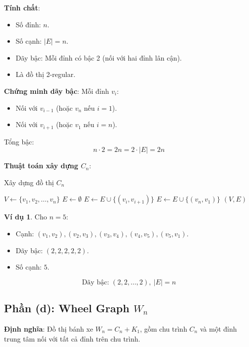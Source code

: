 \documentclass[a4paper,12pt]{article}
\theoremstyle{plain}
\theoremstyle{definition}
\newtheorem{example}{Ví dụ}
\begin{document}
\textbf{Tính chất}:
\begin{itemize}
    \item Số đỉnh: \( n \).
    \item Số cạnh: \( |E| = n \).
    \item Dãy bậc: Mỗi đỉnh có bậc 2 (nối với hai đỉnh lân cận).
    \item Là đồ thị 2-regular.
\end{itemize}

\textbf{Chứng minh dãy bậc}:
Mỗi đỉnh \( v_i \):
\begin{itemize}
    \item Nối với \( v_{i-1} \) (hoặc \( v_n \) nếu \( i=1 \)).
    \item Nối với \( v_{i+1} \) (hoặc \( v_1 \) nếu \( i=n \)).
\end{itemize}
Tổng bậc:
\[
n \cdot 2 = 2n = 2 \cdot |E| = 2n
\]

\textbf{Thuật toán xây dựng \( C_n \)}:
\begin{algorithm}
\caption{Xây dựng đồ thị \( C_n \)}
\begin{algorithmic}
    \State $V \gets \{v_1, v_2, \ldots, v_n\}$
    \State $E \gets \emptyset$
        \State $E \gets E \cup \{(v_i, v_{i+1})\}$
    \EndFor
    \State $E \gets E \cup \{(v_n, v_1)\}$
    \State \Return $(V, E)$
\EndFunction
\end{algorithmic}
\end{algorithm}

\begin{example}
Cho \( n=5 \):
\begin{itemize}
    \item Cạnh: \( (v_1, v_2), (v_2, v_3), (v_3, v_4), (v_4, v_5), (v_5, v_1) \).
    \item Dãy bậc: \( (2, 2, 2, 2, 2) \).
    \item Số cạnh: \( 5 \).
\end{itemize}
\end{example}

\[
\boxed{\text{Dãy bậc: } (2, 2, \ldots, 2), \ |E| = n}
\]

\subsection*{Phần (d): Wheel Graph \( W_n \)}

\textbf{Định nghĩa}: Đồ thị bánh xe \( W_n = C_n + K_1 \), gồm chu trình \( C_n \) và một đỉnh trung tâm nối với tất cả đỉnh trên chu trình.
\end{document}
